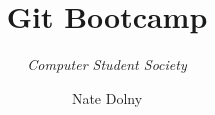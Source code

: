 \documentclass{beamer}
\title{\textbf{Git Bootcamp}}
\subtitle{\textit{Computer Student Society}}
\author{Nate Dolny}
\date{}
\begin{document}
\begin{frame}
	\titlepage
\end{frame}
\end{document}
